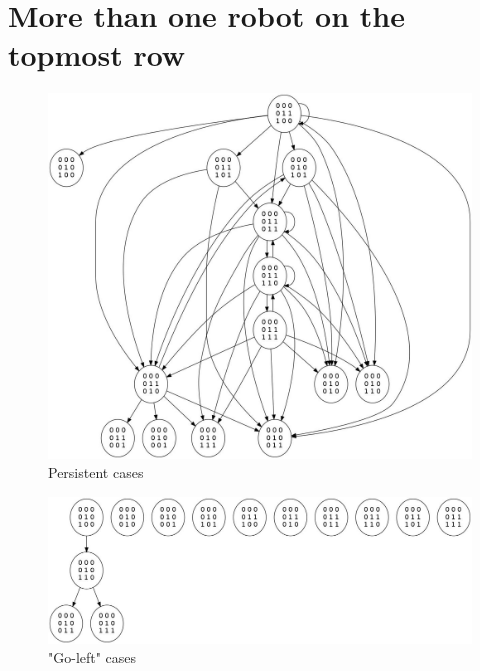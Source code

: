 \documentclass[11pt, a4paper]{article}
\theoremstyle{plain}
\theoremstyle{definition}
\theoremstyle{remark}
\begin{document}
\section{More than one robot on the topmost row}

\begin{figure}
\includegraphics[scale=0.50]{graph_robot_persists.jpg}
\caption{Persistent cases}
\label{graph:persist}
\end{figure}

\begin{figure}
\includegraphics[scale=0.50, angle=90]{graph_robot_go_left.jpg}
\caption{"Go-left" cases}
\label{graph:go-left}
\end{figure}
\end{document}
